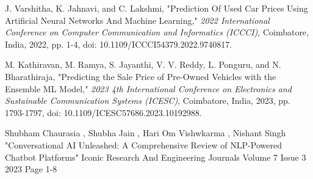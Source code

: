 \documentclass[a4paper,12pt]{article}
\begin{document}
\begin{justify}
\begin{thebibliography}{9}
J. Varshitha, K. Jahnavi, and C. Lakshmi, "Prediction Of Used Car Prices Using Artificial Neural Networks And Machine Learning," \textit{2022 International Conference on Computer Communication and Informatics (ICCCI)}, Coimbatore, India, 2022, pp. 1-4, doi: 10.1109/ICCCI54379.2022.9740817.


M. Kathiravan, M. Ramya, S. Jayanthi, V. V. Reddy, L. Ponguru, and N. Bharathiraja, "Predicting the Sale Price of Pre-Owned Vehicles with the Ensemble ML Model," \textit{2023 4th International Conference on Electronics and Sustainable Communication Systems (ICESC)}, Coimbatore, India, 2023, pp. 1793-1797, doi: 10.1109/ICESC57686.2023.10192988.

Shubham Chaurasia , Shubha Jain , Hari Om Vishwkarma , Nishant Singh "Conversational AI Unleashed: A Comprehensive Review of NLP-Powered Chatbot Platforms" Iconic Research And Engineering Journals Volume 7 Issue 3 2023 Page 1-8


\end{thebibliography}

\end{justify}
\end{document}
